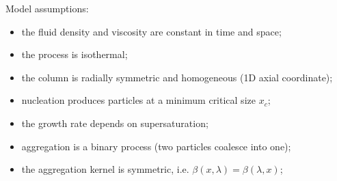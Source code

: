 \documentclass{article}
\begin{document}
Model assumptions:
\begin{itemize}
    \item the fluid density and viscosity are constant in time and space;
    \item the process is isothermal;
    \item the column is radially symmetric and homogeneous (1D axial coordinate);
    \item nucleation produces particles at a minimum critical size $x_{c}$;
    \item the growth rate depends on supersaturation;
    \item aggregation is a binary process (two particles coalesce into one);
    \item the aggregation kernel is symmetric, i.e. $\beta(x, \lambda) = \beta(\lambda, x)$;
\end{itemize}
\end{document}
